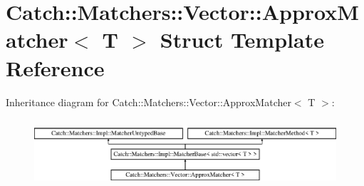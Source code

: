 \hypertarget{structCatch_1_1Matchers_1_1Vector_1_1ApproxMatcher}{}\section{Catch\+::Matchers\+::Vector\+::Approx\+Matcher$<$ T $>$ Struct Template Reference}
\label{structCatch_1_1Matchers_1_1Vector_1_1ApproxMatcher}
Inheritance diagram for Catch\+::Matchers\+::Vector\+::Approx\+Matcher$<$ T $>$\+:\begin{figure}[H]
\begin{center}
\leavevmode
\includegraphics[height=2.514970cm]{structCatch_1_1Matchers_1_1Vector_1_1ApproxMatcher}
\end{center}
\end{figure}
